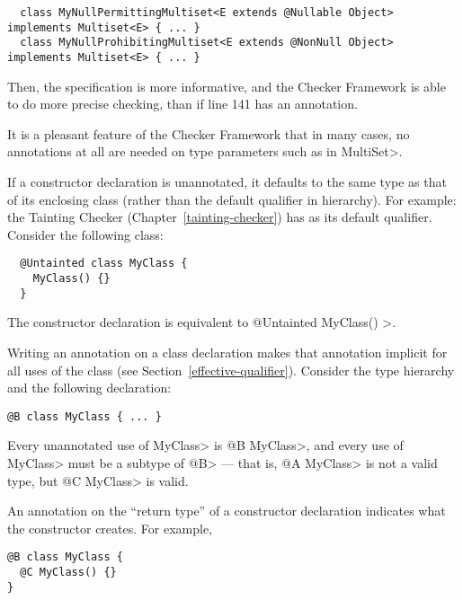 \begin{Verbatim}
  class MyNullPermittingMultiset<E extends @Nullable Object> implements Multiset<E> { ... }
  class MyNullProhibitingMultiset<E extends @NonNull Object> implements Multiset<E> { ... }
\end{Verbatim}

Then, the specification is more informative, and the Checker Framework is
able to do more precise checking, than if line 141 has an annotation.

It is a pleasant feature of the Checker Framework that in many cases, no
annotations at all are needed on type parameters such as  in \<MultiSet>.


If a constructor declaration is unannotated, it defaults to the same type as that of
its enclosing class (rather than the default qualifier in hierarchy).
For example: the Tainting Checker (Chapter~\ref{tainting-checker}) has 
as its default qualifier. Consider the following class:

\begin{Verbatim}
  @Untainted class MyClass {
    MyClass() {}
  }
\end{Verbatim}

The constructor declaration is equivalent to \<@Untainted MyClass() \ttlcb\ttrcb>.



Writing an annotation on a class declaration makes that annotation implicit
for all uses of the class (see Section~\ref{effective-qualifier}).
Consider the type hierarchy  and the following
declaration:

\begin{Verbatim}
@B class MyClass { ... }
\end{Verbatim}

Every unannotated use of \<MyClass> is \<@B MyClass>, and every use of
\<MyClass> must be a subtype of \<@B> --- that is, \<@A MyClass> is not a
valid type, but \<@C MyClass> is valid.

An annotation on the ``return type'' of a constructor declaration indicates
what the constructor creates.  For example,

\begin{Verbatim}
@B class MyClass {
  @C MyClass() {}
}
\end{Verbatim}

